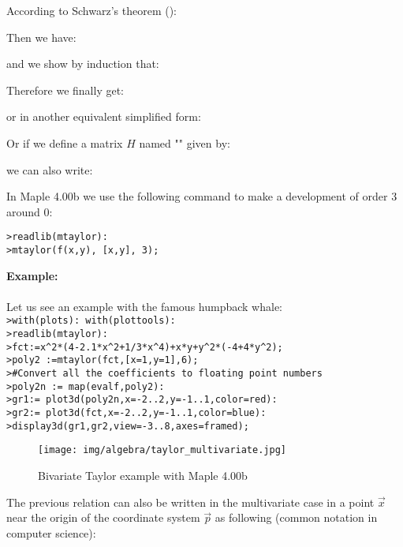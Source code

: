 	According to Schwarz's theorem ():
	
	Then we have:
	
	and we show by induction that:
	
	Therefore we finally get:
	
	or in another equivalent simplified form:
	
	Or if we define a matrix $H$ named "\label{hessian matrix}" given by:
	
	we can also write:
	
	In Maple 4.00b we use the following command to make a development of order $3$ around $0$:
	
	\texttt{>readlib(mtaylor):\\
	>mtaylor(f(x,y), [x,y], 3);}
	
	\begin{tcolorbox}[colframe=black,colback=white,sharp corners]
	\textbf{{\Large {}}Example:}\\\\
	Let us see an example with the famous humpback whale:\\
	
	\texttt{>with(plots): with(plottools):\\
	>readlib(mtaylor):\\
	>fct:=x\string^2*(4-2.1*x\string^2+1/3*x\string^4)+x*y+y\string^2*(-4+4*y\string^2);\\
	>poly2 :=mtaylor(fct,[x=1,y=1],6);\\
	>\#Convert all the coefficients to floating point numbers\\
	>poly2n := map(evalf,poly2):\\
	>gr1:= plot3d(poly2n,x=-2..2,y=-1..1,color=red):\\
	>gr2:= plot3d(fct,x=-2..2,y=-1..1,color=blue):\\
	>display3d({gr1,gr2},view=-3..8,axes=framed);
	}
	\begin{figure}[H]
		\centering
		\texttt{[image: img/algebra/taylor\_multivariate.jpg]}
		\caption{Bivariate Taylor example with Maple 4.00b}
	\end{figure}
	\end{tcolorbox}
	
	The previous relation can also be written in the multivariate case in a point $\vec{x}$ near the origin of the coordinate system $\vec{p}$ as following (common notation in computer science):
	
